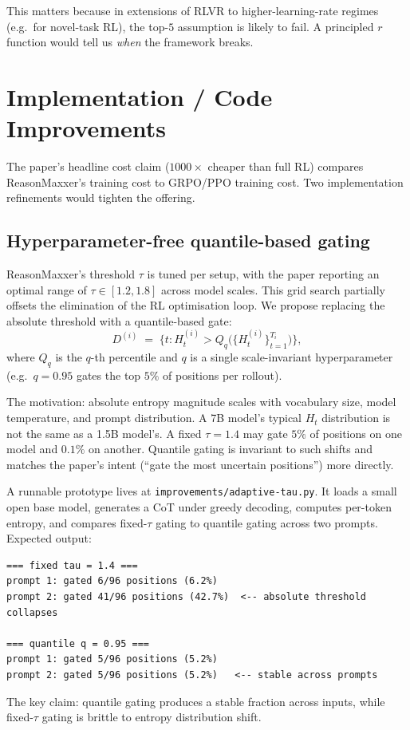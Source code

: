 \documentclass[11pt]{article}
\begin{document}
This matters because in extensions of RLVR to higher-learning-rate regimes (e.g.\ for novel-task RL), the top-$5$ assumption is likely to fail. A principled $r$ function would tell us \emph{when} the framework breaks.

\section*{Implementation / Code Improvements}

The paper's headline cost claim ($1000\times$ cheaper than full RL) compares ReasonMaxxer's training cost to GRPO/PPO training cost. Two implementation refinements would tighten the offering.

\subsection*{Hyperparameter-free quantile-based gating}

ReasonMaxxer's threshold $\tau$ is tuned per setup, with the paper reporting an optimal range of $\tau \in [1.2, 1.8]$ across model scales. This grid search partially offsets the elimination of the RL optimisation loop. We propose replacing the absolute threshold with a quantile-based gate:
\begin{equation}
D^{(i)} \;=\; \{ t : H_t^{(i)} > Q_q\big(\{H_t^{(i)}\}_{t=1}^{T_i}\big) \},
\label{eq:quantile-gate}
\end{equation}
where $Q_q$ is the $q$-th percentile and $q$ is a single scale-invariant hyperparameter (e.g.\ $q = 0.95$ gates the top $5\%$ of positions per rollout).

The motivation: absolute entropy magnitude scales with vocabulary size, model temperature, and prompt distribution. A 7B model's typical $H_t$ distribution is not the same as a 1.5B model's. A fixed $\tau = 1.4$ may gate $5\%$ of positions on one model and $0.1\%$ on another. Quantile gating is invariant to such shifts and matches the paper's intent (``gate the most uncertain positions'') more directly.

A runnable prototype lives at \texttt{improvements/adaptive-tau.py}. It loads a small open base model, generates a CoT under greedy decoding, computes per-token entropy, and compares fixed-$\tau$ gating to quantile gating across two prompts. Expected output:
\begin{lstlisting}
=== fixed tau = 1.4 ===
prompt 1: gated 6/96 positions (6.2%)
prompt 2: gated 41/96 positions (42.7%)  <-- absolute threshold collapses

=== quantile q = 0.95 ===
prompt 1: gated 5/96 positions (5.2%)
prompt 2: gated 5/96 positions (5.2%)   <-- stable across prompts
\end{lstlisting}
The key claim: quantile gating produces a stable fraction across inputs, while fixed-$\tau$ gating is brittle to entropy distribution shift.
\end{document}
